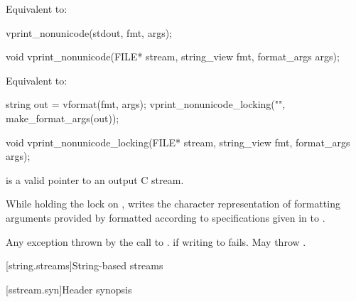 \begin{itemdescr}
\pnum
\effects
Equivalent to:
\begin{codeblock}
vprint_nonunicode(stdout, fmt, args);
\end{codeblock}
\end{itemdescr}

%
\begin{itemdecl}
void vprint_nonunicode(FILE* stream, string_view fmt, format_args args);
\end{itemdecl}

\begin{itemdescr}
\pnum
\effects
Equivalent to:
\begin{codeblock}
string out = vformat(fmt, args);
vprint_nonunicode_locking("{}", make_format_args(out));
\end{codeblock}
\end{itemdescr}

%
\begin{itemdecl}
void vprint_nonunicode_locking(FILE* stream, string_view fmt, format_args args);
\end{itemdecl}

\begin{itemdescr}
\pnum
\expects
{} is a valid pointer to an output C stream.

\pnum
\effects
While holding the lock on ,
writes the character representation of
formatting arguments provided by 
formatted according to specifications given in  to .

\pnum
\throws
Any exception thrown by the call to .
 if writing to  fails.
May throw .
\end{itemdescr}

[string.streams]{String-based streams}

[sstream.syn]{Header  synopsis}

